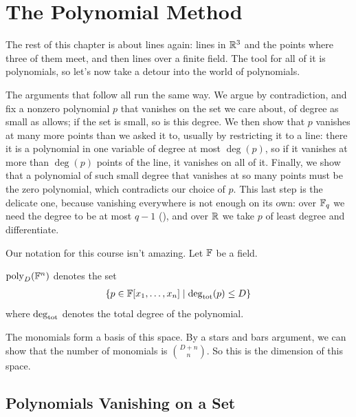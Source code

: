 \section{The Polynomial Method} \label{Ch7:Sec:Polynomial_Method}

The rest of this chapter is about lines again: lines in $\mathbb{R}^3$ and the points where three of them meet, and then lines over a finite field. The tool for all of it is polynomials, so let's now take a detour into the world of polynomials.

The arguments that follow all run the same way. We argue by contradiction, and fix a nonzero polynomial $p$ that vanishes on the set we care about, of degree as small as  allows; if the set is small, so is this degree. We then show that $p$ vanishes at many more points than we asked it to, usually by restricting it to a line: there it is a polynomial in one variable of degree at most $\deg(p)$, so if it vanishes at more than $\deg(p)$ points of the line, it vanishes on all of it. Finally, we show that a polynomial of such small degree that vanishes at so many points must be the zero polynomial, which contradicts our choice of $p$. This last step is the delicate one, because vanishing everywhere is not enough on its own: over $\mathbb{F}_q$ we need the degree to be at most $q - 1$ (), and over $\mathbb{R}$ we take $p$ of least degree and differentiate.

Our notation for this course isn't amazing. Let $\mathbb{F}$ be a field.

\begin{boxnotation}
    $\operatorname{poly}_D\!\left( \mathbb{F}^n \right)$ denotes the set
    \begin{align*}
        \left\{ p \in \mathbb{F}\!\left[ x_1, \ldots, x_n \right] \; \middle\vert \; \deg_{\operatorname{tot}}\!\left( p \right) \leq D \right\}
    \end{align*}
    where $\deg_{\operatorname{tot}}$ denotes the total degree of the polynomial.
\end{boxnotation}

The monomials form a basis of this space. By a stars and bars argument, we can show that the number of monomials is $\binom{D + n}{n}$. So this is the dimension of this space.

\subsection{Polynomials Vanishing on a Set}

